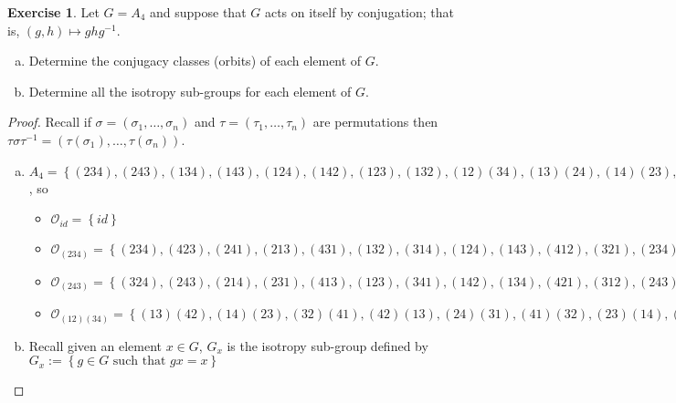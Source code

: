 \documentclass{article}
\theoremstyle{definition}
\newtheorem{theorem}{Exercise}[section]
\theoremstyle{plain}
\newcommand{\inv}[1]{#1^{-1}}
\begin{document}
	
	\setcounter{theorem}{4}
	\begin{theorem}
		Let $G = A_4$ and suppose that $G$ acts on itself by conjugation; that is, $\left( g, h \right) \mapsto gh\inv{g}$. 
		\begin{enumerate}[(a)]
			\item Determine the conjugacy classes (orbits) of each element of $G$.
			\item Determine all the isotropy sub-groups for each element of $G$. 
		\end{enumerate}
	\end{theorem}
	\begin{proof} Recall if $\sigma = \left( \sigma_1, \ldots, \sigma_n \right)$ and $\tau = \left( \tau_1, \ldots, \tau_n \right)$ are permutations then $\tau\sigma\inv{\tau} = \left( \tau\left( \sigma_1 \right), \ldots, \tau\left( \sigma_n \right) \right)$. 
		\begin{enumerate}[(a)]
		
		\item $A_4 = \left\{ (234), (243), (134), (143), (124), (142), (123), (132), (12)(34), (13)(24), (14)(23), id \right\}$, so
		\begin{itemize}
			\item $\mathcal{O}_{id} = \left\{ id \right\}$
			\item $\mathcal{O}_{(234)} = \left\{ (234), (423), (241), (213), (431), (132), (314), (124), (143), (412), (321), (234) \right\} = \left\{ (234), (124), (132), (143)\right\}$ 
			\item $\mathcal{O}_{(243)} = \left\{ (324), (243), (214), (231), (413), (123), (341), (142), (134), (421), (312), (243) \right\} = \left\{ (243), (142), (123), (134) \right\}$
			\item $\mathcal{O}_{(12)(34)} = \left\{ (13)(42), (14)(23), (32)(41), (42)(13), (24)(31), (41)(32), (23)(14), (31)(24), (12)(34), (43)(12), (43)(12), (12)(34) \right\} = \left\{ (13)(24), (14)(23), (12)(34) \right\}$
		\end{itemize}
		
		\item Recall given an element $x\in G$, $G_x$ is the isotropy sub-group defined by $G_x := \left\{ g \in G \text{ such that } gx = x \right\}$
		\end{enumerate}
	\end{proof}
\end{document}
